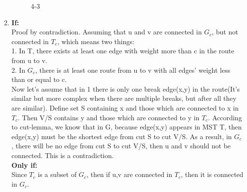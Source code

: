 \documentclass[12pt, notitlepage]{article}
\begin{document}
\begin{enumerate}
\begin{figure}[H]
	\caption{4-3} \nonumber\label{fig:4-3}\vspace{-10pt}
    \end{figure}
	\item
	\textbf{If:}\\
	Proof by contradiction. Assuming that u and v are connected in $G_c$, but not connected in $T_c$, which means two things:\\
	1. In T, there exists at least one edge with weight more than c in the route from u to v. \\
	2. In $G_c$, there is at least one route from u to v with all edges' weight less than or equal to c.\\
	Now let's assume that in 1 there is only one break edge(x,y) in the route(It's similar but more complex when there are multiple breaks, but after all they are similar). Define set S containing x and those which are connected to x in $T_c$. Then V/S contains y and those which are connected to y in $T_c$. According to cut-lemma, we know that in G, because edge(x,y) appears in MST T, then edge(x,y) must be the shortest edge from cut S to cut V/S. As a result, in $G_c$, there will be no edge from cut S to cut V/S, then u and v should not be connected. This is a contradiction.\\
	\textbf{Only if:}\\
	Since $T_c$ is a subset of $G_c$, then if u,v are connected in $T_c$, then it is connected in $G_c$.
\end{enumerate}
\end{document}

